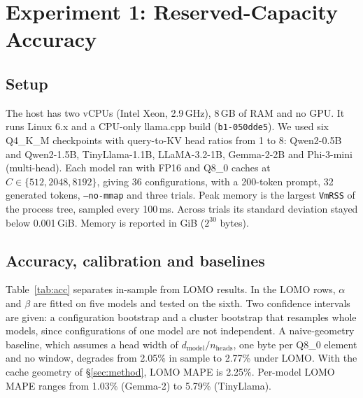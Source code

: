 \documentclass[conference]{IEEEtran}
\begin{document}
\section{Experiment 1: Reserved-Capacity Accuracy}
\label{sec:e1}
\subsection{Setup}
The host has two vCPUs (Intel Xeon, 2.9\,GHz), 8\,GB of RAM and no GPU. It runs Linux 6.x and a CPU-only llama.cpp build (\texttt{b1-050dde5}). We used six Q4\_K\_M checkpoints with query-to-KV head ratios from 1 to 8: Qwen2-0.5B and Qwen2-1.5B, TinyLlama-1.1B, LLaMA-3.2-1B, Gemma-2-2B and Phi-3-mini (multi-head). Each model ran with FP16 and Q8\_0 caches at $C \in \{512, 2048, 8192\}$, giving 36 configurations, with a 200-token prompt, 32 generated tokens, \texttt{--no-mmap} and three trials. Peak memory is the largest \texttt{VmRSS} of the process tree, sampled every 100\,ms. Across trials its standard deviation stayed below 0.001\,GiB. Memory is reported in GiB ($2^{30}$ bytes).

\subsection{Accuracy, calibration and baselines}
Table~\ref{tab:acc} separates in-sample from LOMO results. In the LOMO rows, $\alpha$ and $\beta$ are fitted on five models and tested on the sixth. Two confidence intervals are given: a configuration bootstrap and a cluster bootstrap that resamples whole models, since configurations of one model are not independent. A naive-geometry baseline, which assumes a head width of $d_{\mathrm{model}}/n_{\mathrm{heads}}$, one byte per Q8\_0 element and no window, degrades from 2.05\% in sample to 2.77\% under LOMO. With the cache geometry of \S\ref{sec:method}, LOMO MAPE is 2.25\%. Per-model LOMO MAPE ranges from 1.03\% (Gemma-2) to 5.79\% (TinyLlama).
\end{document}
